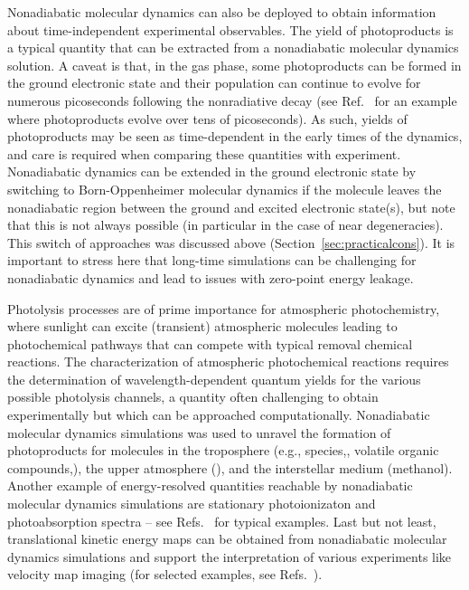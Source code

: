 \documentclass[9pt,bestpractices,pubversion]{livecoms}
\begin{document}
Nonadiabatic molecular dynamics can also be deployed to obtain information about time-independent experimental observables. The yield of photoproducts is a typical quantity that can be extracted from a nonadiabatic molecular dynamics solution. A caveat is that, in the gas phase, some photoproducts can be formed in the ground electronic state\cite{mignolet2016rich} and their population can continue to evolve for numerous picoseconds following the nonradiative decay (see Ref.~ for an example where photoproducts evolve over tens of picoseconds). As such, yields of photoproducts may be seen as time-dependent in the early times of the dynamics, and care is required when comparing these quantities with experiment. Nonadiabatic dynamics can be extended in the ground electronic state by switching to Born-Oppenheimer molecular dynamics if the molecule leaves the nonadiabatic region between the ground and excited electronic state(s), but note that this is not always possible (in particular in the case of near degeneracies). This switch of approaches was discussed above (Section~\ref{sec:practicalcons}). It is important to stress here that long-time simulations can be challenging for nonadiabatic dynamics\cite{Mukherjeelongtime2025} and lead to issues with zero-point energy leakage.\cite{PersicoZPE2023} 

Photolysis processes are of prime importance for atmospheric photochemistry, where sunlight can excite (transient) atmospheric molecules leading to photochemical pathways that can compete with typical removal chemical reactions. The characterization of atmospheric photochemical reactions requires the determination of wavelength-dependent quantum yields for the various possible photolysis channels, a quantity often challenging to obtain experimentally\cite{Curchodatmophotochem2024} but which can be approached computationally.\cite{Prljphotolysis2020} Nonadiabatic molecular dynamics simulations was used to unravel the formation of photoproducts for molecules in the troposphere (e.g.,  species,\cite{rocasanjuan2020mercury}, volatile organic compounds,\cite{marsili2022theoretical,HuttonPA2022}), the upper atmosphere (\cite{carmona-garcia2021hoso}), and the interstellar medium (methanol\cite{cigrang2024methanol}). Another example of energy-resolved quantities reachable by nonadiabatic molecular dynamics simulations are stationary photoionizaton and photoabsorption spectra -- see Refs.~\cite{toddaims,taylor2018phenol,parkes2024thiophene} for typical examples. Last but not least, translational kinetic energy maps can be obtained from nonadiabatic molecular dynamics simulations and support the interpretation of various experiments like velocity map imaging (for selected examples, see Refs.~).
\end{document}
